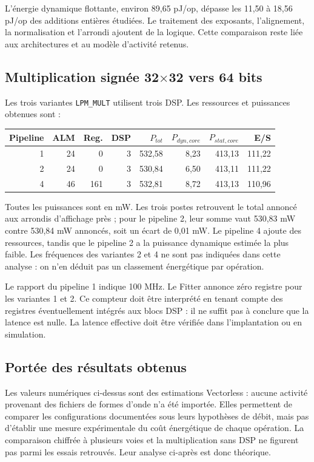 \documentclass[11pt,a4paper]{article}
\begin{document}
L'énergie dynamique flottante, environ 89,65 pJ/op, dépasse les 11,50 à 18,56 pJ/op des additions entières étudiées. Le traitement des exposants, l'alignement, la normalisation et l'arrondi ajoutent de la logique. Cette comparaison reste liée aux architectures et au modèle d'activité retenus.

\subsection{Multiplication signée 32$\times$32 vers 64 bits}
Les trois variantes \texttt{LPM\_MULT} utilisent trois DSP. Les ressources et puissances obtenues sont :
\begin{center}
\begin{tabular}{@{}rrrrrrrr@{}}
\toprule
Pipeline & ALM & Reg. & DSP & $P_{tot}$ & $P_{dyn,core}$ & $P_{stat,core}$ & E/S\\
\midrule
1 & 24 & 0 & 3 & 532,58 & 8,23 & 413,13 & 111,22\\
2 & 24 & 0 & 3 & 530,84 & 6,50 & 413,11 & 111,22\\
4 & 46 & 161 & 3 & 532,81 & 8,72 & 413,13 & 110,96\\
\bottomrule
\end{tabular}
\end{center}
Toutes les puissances sont en mW. Les trois postes retrouvent le total annoncé aux arrondis d'affichage près ; pour le pipeline 2, leur somme vaut 530,83 mW contre 530,84 mW annoncés, soit un écart de 0,01 mW. Le pipeline 4 ajoute des ressources, tandis que le pipeline 2 a la puissance dynamique estimée la plus faible. Les fréquences des variantes 2 et 4 ne sont pas indiquées dans cette analyse : on n'en déduit pas un classement énergétique par opération.

Le rapport du pipeline 1 indique 100 MHz. Le Fitter annonce zéro registre pour les variantes 1 et 2. Ce compteur doit être interprété en tenant compte des registres éventuellement intégrés aux blocs DSP : il ne suffit pas à conclure que la latence est nulle. La latence effective doit être vérifiée dans l'implantation ou en simulation.

\subsection{Portée des résultats obtenus}
Les valeurs numériques ci-dessus sont des estimations Vectorless : aucune activité provenant des fichiers de formes d'onde n'a été importée. Elles permettent de comparer les configurations documentées sous leurs hypothèses de débit, mais pas d'établir une mesure expérimentale du coût énergétique de chaque opération. La comparaison chiffrée à plusieurs voies et la multiplication sans DSP ne figurent pas parmi les essais retrouvés. Leur analyse ci-après est donc théorique.
\end{document}
